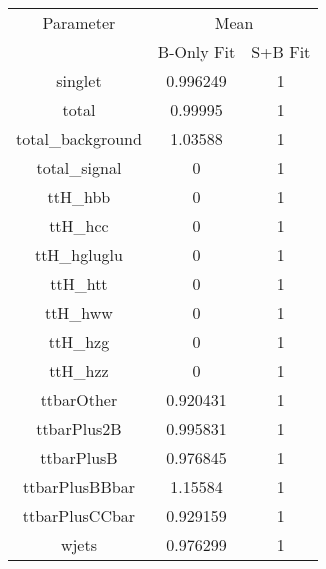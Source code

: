 \begin{table}
\centering
\begin{tabular}{ccc}
\toprule
Parameter & \multicolumn{2}{c}{Mean}\\
 & B-Only Fit & S+B Fit\\
\midrule
singlet & \num{0.996249} & \num{1}\\
total & \num{0.99995} & \num{1}\\
total\_background & \num{1.03588} & \num{1}\\
total\_signal & \num{0} & \num{1}\\
ttH\_hbb & \num{0} & \num{1}\\
ttH\_hcc & \num{0} & \num{1}\\
ttH\_hgluglu & \num{0} & \num{1}\\
ttH\_htt & \num{0} & \num{1}\\
ttH\_hww & \num{0} & \num{1}\\
ttH\_hzg & \num{0} & \num{1}\\
ttH\_hzz & \num{0} & \num{1}\\
ttbarOther & \num{0.920431} & \num{1}\\
ttbarPlus2B & \num{0.995831} & \num{1}\\
ttbarPlusB & \num{0.976845} & \num{1}\\
ttbarPlusBBbar & \num{1.15584} & \num{1}\\
ttbarPlusCCbar & \num{0.929159} & \num{1}\\
wjets & \num{0.976299} & \num{1}\\
\bottomrule
\end{tabular}
\end{table}